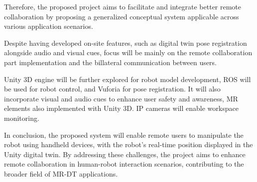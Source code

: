 Therefore, the proposed project aims to facilitate and integrate better remote collaboration by proposing a generalized conceptual system applicable across various application scenarios.

Despite having developed on-site features, such as digital twin pose registration alongside audio and visual cues, focus will be mainly on the remote collaboration part implementation and the billateral communication between users.

Unity 3D engine will be further explored for robot model development, \ac{ROS} will be used for robot control, and Vuforia for pose registration. It will also incorporate visual and audio cues to enhance user safety and awareness, \ac{MR} elements also implemented with Unity 3D. IP cameras will enable workspace monitoring. 

In conclusion, the proposed system will enable remote users to manipulate the robot using handheld devices, with the robot's real-time position displayed in the Unity digital twin. By addressing these challenges, the project aims to enhance remote collaboration in human-robot interaction scenarios, contributing to the broader field of \ac{MR}-\ac{DT} applications.









